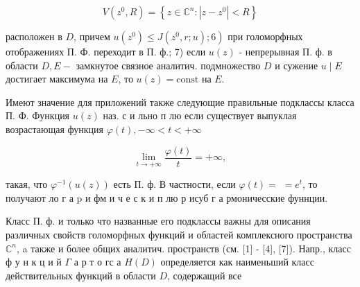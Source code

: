 \documentclass[10pt]{article}
\begin{document}
\[

V\left(z^{0}, R\right)=\left\{z \in \mathbb{C}^{n}:\left|z-z^{0}\right|<R\right\}

\]



расположен в $D$, причем $\left.u\left(z^{0}\right) \leqslant J\left(z^{0}, r ; u\right) ; 6\right)$ при голоморфных отображениях П. Ф. переходит в П. ф.; 7) если $u(z)$ - непрерывная П. ф. в области $D, E-$ замкнутое связное аналитич. подмножество $D$ и сужение $u \mid E$ достигает максимума на $E$, то $u(z)=\mathrm{const}$ на $E$.



Имеют значение для приложений также следующие правильные подклассы класса П. Ф. Функция $u(z)$ наз. с и льно п лю если существует выпуклая возрастающая функция $\varphi(t),-\infty<t<+\infty$



\[

\lim _{t \rightarrow+\infty} \frac{\varphi(t)}{t}=+\infty,

\]



такая, что $\varphi^{-1}(u(z))$ есть П. ф. В частности, если $\varphi(t)=$ $=e^{t}$, то получают ло г а $\mathrm{p}$ и фм и ч е с к и п лю р исуб г а рмоничесские фуннции.



Класс П. ф. и только что названные его подклассы важны для описания различных свойств голоморфных функций и областей комплексного пространства $\mathbb{C}^{n}$, a также и более общих аналитич. пространств (см. [1] - [4], [7]). Напр., класс ф у н к ц и й $\Gamma$ а р т о гс а $H(D)$ определяется как наименьший класс действительных функций в области $D$, содержащий все
\end{document}
